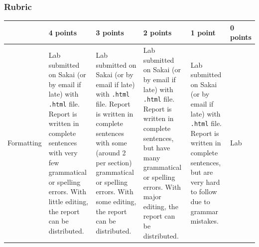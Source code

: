 \documentclass[
  letterpaper,
  DIV=11,
  numbers=noendperiod]{scrartcl}
\begin{document}
\subsubsection{Rubric}

\begin{longtable}[]{@{}
  >{\raggedright\arraybackslash}p{}
  >{\raggedright\arraybackslash}p{}
  >{\raggedright\arraybackslash}p{}
  >{\raggedright\arraybackslash}p{}
  >{\raggedright\arraybackslash}p{}
  >{\raggedright\arraybackslash}p{}@{}}
\toprule\noalign{}
\begin{minipage}[b]{\linewidth}\raggedright
\end{minipage} & \begin{minipage}[b]{\linewidth}\raggedright
4 points
\end{minipage} & \begin{minipage}[b]{\linewidth}\raggedright
3 points
\end{minipage} & \begin{minipage}[b]{\linewidth}\raggedright
2 points
\end{minipage} & \begin{minipage}[b]{\linewidth}\raggedright
1 point
\end{minipage} & \begin{minipage}[b]{\linewidth}\raggedright
0 points
\end{minipage} \\
\midrule\noalign{}
\endhead
\bottomrule\noalign{}
\endlastfoot
Formatting & Lab submitted on Sakai (or by email if late) with
\texttt{.html} file. Report is written in complete sentences with very
few grammatical or spelling errors. With little editing, the report can
be distributed. & Lab submitted on Sakai (or by email if late) with
\texttt{.html} file. Report is written in complete sentences with some
(around 2 per section) grammatical or spelling errors. With some
editing, the report can be distributed. & Lab submitted on Sakai (or by
email if late) with \texttt{.html} file. Report is written in complete
sentences, but have many grammatical or spelling errors. With major
editing, the report can be distributed. & Lab submitted on Sakai (or by
email if late) with \texttt{.html} file. Report is written in complete
sentences, but are very hard to follow due to grammar mistakes. & Lab

\end{longtable}
\end{document}
